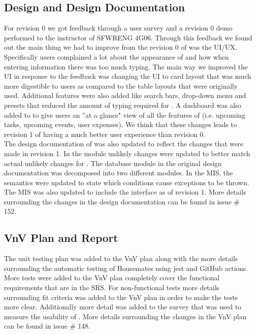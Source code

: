 \documentclass{article}
\begin{document}
\subsection{Design and Design Documentation}

For revision 0 we got feedback through a user survey and a revision 0 demo performed to the instructor of SFWRENG 4G06. Through this feedback we found out the main thing we had to improve from the revision 0 of \progname{} was the UI/UX. Specifically users complained a lot about the appearance of \progname{} and how when entering information there was too much typing. The main way we improved the UI in response to the feedback was changing the UI to card layout that was much more digestible to users as compared to the table layouts that were originally used. Additional features were also added like search bars, drop-down menu and presets that reduced the amount of typing required for \progname{}. A dashboard was also added to \progname{} to give users an ''at a glance" view of all the features of \progname{} (i.e. upcoming tasks, upcoming events, user expenses). We think that these changes leads to revision 1 of \progname{} having a much better user experience than revision 0. \\

The design documentation of \progname{} was also updated to reflect the changes that were made in revision 1. In the module unlikely changes were updated to better match actual unlikely changes for \progname{}. The database module in the original design documentation was decomposed into two different modules. In the MIS, the semantics were updated to state which conditions cause exceptions to be thrown. The MIS was also updated to include the interface as of revision 1. More details surrounding the changes in the design documentation can be found in issue \# 152.

\subsection{VnV Plan and Report}

The unit testing plan was added to the VnV plan along with the more details surrounding the automatic testing of Housemates using jest and GitHub actions. More tests were added to the VnV plan completely cover the functional requirements that are in the SRS. For non-functional tests more details surrounding fit criteria was added to the VnV plan in order to make the tests more clear. Additionally more detail was added to the survey that was used to measure the usability of \progname{}. More details surrounding the changes in the VnV plan can be found in issue \# 148. \\
\end{document}
